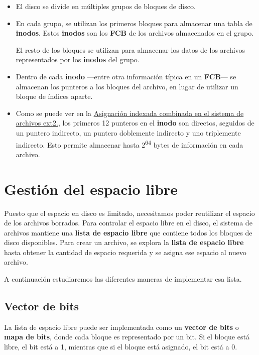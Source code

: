 \begin{itemize}
\item
  El disco se divide en múltiples grupos de bloques de disco.
\item
  En cada grupo, se utilizan los primeros bloques para almacenar una
  tabla de \textbf{inodos}{}. Estos \textbf{inodos} son los \textbf{FCB}
  de los archivos almacenados en el grupo.

  El resto de los bloques se utilizan para almacenar los datos de los
  archivos representados por los \textbf{inodos} del grupo.
\item
  Dentro de cada \textbf{inodo} ---entre otra información típica en un
  \textbf{FCB}--- se almacenan los punteros a los bloques del archivo,
  en lugar de utilizar un bloque de índices aparte.
\item
  Como se puede ver en la \hyperref[fig-asignaciuxf3n-ext2]{Asignación
  indexada combinada en el sistema de archivos ext2.}, los primeros 12
  punteros en el \textbf{inodo} son directos, seguidos de un puntero
  indirecto, un puntero doblemente indirecto y uno triplemente
  indirecto. Esto permite almacenar hasta 2\textsuperscript{64} bytes de
  información en cada archivo.
\end{itemize}

\section{Gestión del espacio libre}\label{_gestiuxf3n_del_espacio_libre}

Puesto que el espacio en disco es limitado, necesitamos poder reutilizar
el espacio de los archivos borrados. Para controlar el espacio libre en
el disco, el sistema de archivos mantiene una \textbf{lista de espacio
libre} que contiene todos los bloques de disco disponibles. Para crear
un archivo, se explora la \textbf{lista de espacio libre} hasta obtener
la cantidad de espacio requerida y se asigna ese espacio al nuevo
archivo.

A continuación estudiaremos las diferentes maneras de implementar esa
lista.

\subsection{Vector de bits}\label{_vector_de_bits}

La lista de espacio libre puede ser implementada como un \textbf{vector
de bits} o \textbf{mapa de bits}, donde cada bloque es representado por
un bit. Si el bloque está libre, el bit está a 1, mientras que si el
bloque está asignado, el bit está a 0.

